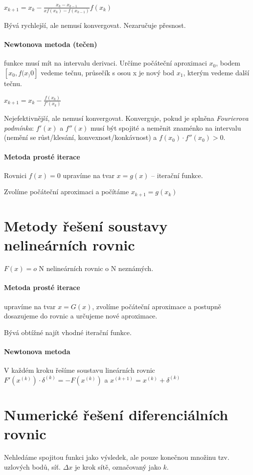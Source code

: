 \documentclass[a4paper, 11pt]{report}
\begin{document}
$x_{k+1} = x_k - \frac{x_k - x_{k-1}}{xf(x_k) - f(x_{k-1})} f(x_k)$

Bývá rychlejší, ale nemusí konvergovat. Nezaručuje přesnost.

\paragraph{Newtonova metoda (tečen)}
funkce musí mít na intervalu derivaci. Určíme počáteční aproximaci $x_0$, bodem $[x_0, f(x_)0]$ vedeme tečnu, průsečík s osou x je nový bod $x_1$, kterým vedeme další tečnu.

$x_{k+1} = x_k - \frac{f(x_k)}{f'(x_k)}$

Nejefektivnější, ale nemusí konvergovat. Konverguje, pokud je splněna \emph{Fourierova podmínka}: $f'(x)$ a $f''(x)$ musí být spojité a neměnit znaménko na intervalu (nemění se růst/klesání, konvexnost/konkávnost) a $f(x_0) \cdot f''(x_0) > 0$.

\paragraph{Metoda prosté iterace}
Rovnici $f(x) = 0$ upravíme na tvar $x = g(x)$ -- iterační funkce.

Zvolíme počáteční aproximaci a počítáme $x_{k+1} = g(x_k)$

\section{Metody řešení soustavy nelineárních rovnic}

$F(x) = o$ N nelineárních rovnic o N neznámých.

\paragraph{Metoda prosté iterace}
upravíme na tvar $x = G(x)$, zvolíme počáteční aproximace a postupně dosazujeme do rovnic a určujeme nové aproximace.

Bývá obtížné najít vhodné iterační funkce.

\paragraph{Newtonova metoda}
V každém kroku řešíme soustavu lineárních rovnic $F'(x^{(k)}) \cdot \delta^{(k)} = -F(x^{(k)})$ a $x^{(k+1)} = x^{(k)} + \delta^{(k)}$ 

\section{Numerické řešení diferenciálních rovnic}
Nehledáme spojitou funkci jako výsledek, ale pouze konečnou množinu tzv. uzlových bodů, síť. $\Delta x$ je krok sítě, označovaný jako $k$.
\end{document}
